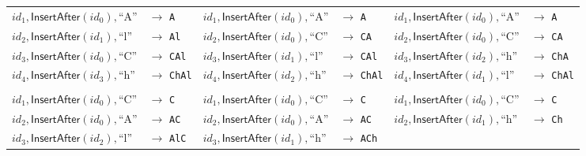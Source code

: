 \begin{figure}
\setlength{\tabcolsep}{1pt}
\begin{tabular}{ll|ll|ll}
$\mathit{id}_1, \mathsf{InsertAfter}(\mathit{id}_0), \text{``A''}$ & $\rightarrow$ \texttt{A} &
$\mathit{id}_1, \mathsf{InsertAfter}(\mathit{id}_0), \text{``A''}$ & $\rightarrow$ \texttt{A} &
$\mathit{id}_1, \mathsf{InsertAfter}(\mathit{id}_0), \text{``A''}$ & $\rightarrow$ \texttt{A} \\
$\mathit{id}_2, \mathsf{InsertAfter}(\mathit{id}_1), \text{``l''}$ & $\rightarrow$ \texttt{Al} &
$\mathit{id}_2, \mathsf{InsertAfter}(\mathit{id}_0), \text{``C''}$ & $\rightarrow$ \texttt{CA} &
$\mathit{id}_2, \mathsf{InsertAfter}(\mathit{id}_0), \text{``C''}$ & $\rightarrow$ \texttt{CA} \\
$\mathit{id}_3, \mathsf{InsertAfter}(\mathit{id}_0), \text{``C''}$ & $\rightarrow$ \texttt{CAl} &
$\mathit{id}_3, \mathsf{InsertAfter}(\mathit{id}_1), \text{``l''}$ & $\rightarrow$ \texttt{CAl} &
$\mathit{id}_3, \mathsf{InsertAfter}(\mathit{id}_2), \text{``h''}$ & $\rightarrow$ \texttt{ChA} \\
$\mathit{id}_4, \mathsf{InsertAfter}(\mathit{id}_3), \text{``h''}$ & $\rightarrow$ \texttt{ChAl} &
$\mathit{id}_4, \mathsf{InsertAfter}(\mathit{id}_2), \text{``h''}$ & $\rightarrow$ \texttt{ChAl} &
$\mathit{id}_4, \mathsf{InsertAfter}(\mathit{id}_1), \text{``l''}$ & $\rightarrow$ \texttt{ChAl} \\[6pt] \hline &&&&&\\[-6pt]
$\mathit{id}_1, \mathsf{InsertAfter}(\mathit{id}_0), \text{``C''}$ & $\rightarrow$ \texttt{C} &
$\mathit{id}_1, \mathsf{InsertAfter}(\mathit{id}_0), \text{``C''}$ & $\rightarrow$ \texttt{C} &
$\mathit{id}_1, \mathsf{InsertAfter}(\mathit{id}_0), \text{``C''}$ & $\rightarrow$ \texttt{C} \\
$\mathit{id}_2, \mathsf{InsertAfter}(\mathit{id}_0), \text{``A''}$ & $\rightarrow$ \texttt{AC} &
$\mathit{id}_2, \mathsf{InsertAfter}(\mathit{id}_0), \text{``A''}$ & $\rightarrow$ \texttt{AC} &
$\mathit{id}_2, \mathsf{InsertAfter}(\mathit{id}_1), \text{``h''}$ & $\rightarrow$ \texttt{Ch} \\
$\mathit{id}_3, \mathsf{InsertAfter}(\mathit{id}_2), \text{``l''}$ & $\rightarrow$ \texttt{AlC} &
$\mathit{id}_3, \mathsf{InsertAfter}(\mathit{id}_1), \text{``h''}$ & $\rightarrow$ \texttt{ACh} &

\end{tabular}
\end{figure}
